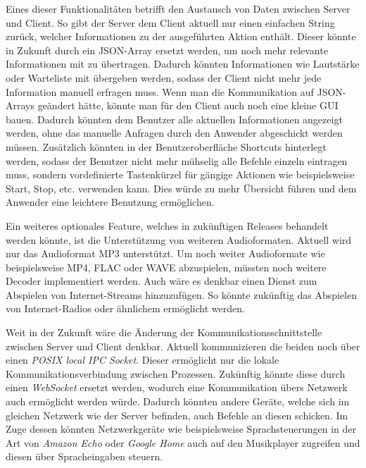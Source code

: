 Eines dieser Funktionalitäten betrifft den Austausch von Daten zwischen 
Server und Client. So gibt der Server dem Client aktuell nur einen einfachen
String zurück, welcher Informationen zu der ausgeführten Aktion enthält. Dieser
könnte in Zukunft durch ein \ac{JSON}-Array ersetzt werden, um noch mehr
relevante Informationen mit zu übertragen. Dadurch könnten Informationen wie
Lautstärke oder Warteliste mit übergeben werden, sodass der Client nicht mehr
jede Information manuell erfragen muss. \newline
Wenn man die Kommunikation auf \ac{JSON}-Arrays geändert hätte, könnte man für
den Client auch noch eine kleine \ac{GUI} bauen. Dadurch könnten dem Benutzer alle
aktuellen Informationen angezeigt werden, ohne das manuelle Anfragen durch den
Anwender abgeschickt werden müssen. Zusätzlich könnten in der Benutzeroberfläche
Shortcuts hinterlegt werden, sodass der Benutzer nicht mehr mühselig alle
Befehle einzeln eintragen muss, sondern vordefinierte Tastenkürzel für gängige
Aktionen wie beispielsweise Start, Stop, etc. verwenden kann. Dies würde zu mehr Übersicht
führen und dem Anwender eine leichtere Benutzung ermöglichen. \hfill \break

Ein weiteres optionales Feature, welches in zukünftigen Releases behandelt werden könnte,
ist die Unterstützung von weiteren Audioformaten. Aktuell wird nur das
Audioformat \ac{MP3} unterstützt. Um noch weiter Audioformate wie
beispielsweise \ac{MP4}, \ac{FLAC} oder \ac{WAVE} abzuspielen,
müssten noch weitere Decoder implementiert werden. \newline
Auch wäre es denkbar einen Dienst zum Abspielen von Internet-Streams
hinzuzufügen. So könnte zukünftig das Abspielen von Internet-Radios oder
ähnlichem ermöglicht werden. \hfill \break

Weit in der Zukunft wäre die Änderung der Kommunikationsschnittstelle zwischen
Server und Client denkbar. Aktuell kommunizieren die beiden noch über einen
\textit{\ac{POSIX} local \ac{IPC} Socket}. Dieser ermöglicht nur die lokale
Kommunikationsverbindung zwischen Prozessen. Zukünftig könnte diese durch einen
\textit{WebSocket} ersetzt werden, wodurch eine Kommunikation übers Netzwerk
auch ermöglicht werden würde. Dadurch könnten andere Geräte, welche sich im
gleichen Netzwerk wie der Server befinden, auch Befehle an diesen schicken. 
Im Zuge dessen könnten Netzwerkgeräte wie beispielsweise Sprachsteuerungen in
der Art von \textit{Amazon Echo} oder \textit{Google Home} auch auf den
Musikplayer zugreifen und diesen über Spracheingaben steuern.


